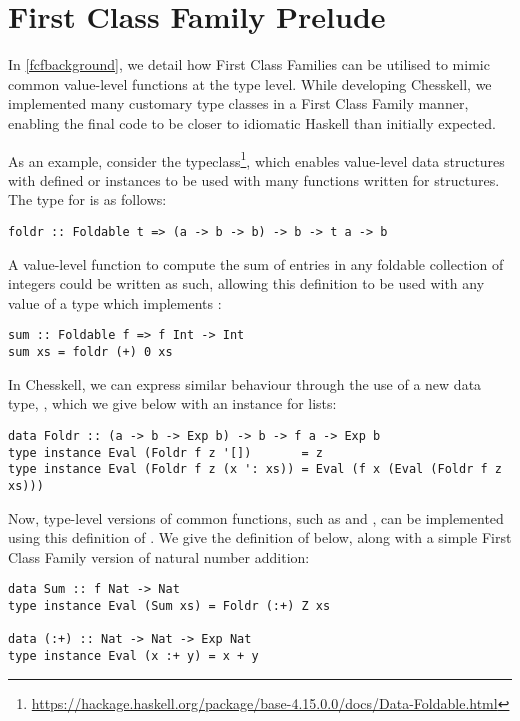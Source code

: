 \section{First Class Family Prelude}

In \cref{fcfbackground}, we detail how First Class Families can be utilised to mimic common value-level functions at the type level. While developing Chesskell, we implemented many customary type classes in a First Class Family manner, enabling the final code to be closer to idiomatic Haskell than initially expected.

As an example, consider the  typeclass\footnote{\url{https://hackage.haskell.org/package/base-4.15.0.0/docs/Data-Foldable.html}}, which enables value-level data structures with defined  or  instances to be used with many functions written for  structures. The type for  is as follows:

\begin{lstlisting}
foldr :: Foldable t => (a -> b -> b) -> b -> t a -> b
\end{lstlisting}

A value-level function to compute the sum of entries in any foldable collection of integers could be written as such, allowing this definition to be used with any value of a type which implements :

\begin{lstlisting}
sum :: Foldable f => f Int -> Int
sum xs = foldr (+) 0 xs
\end{lstlisting}

In Chesskell, we can express similar behaviour through the use of a new data type, , which we give below with an  instance for lists:

\begin{lstlisting}
data Foldr :: (a -> b -> Exp b) -> b -> f a -> Exp b
type instance Eval (Foldr f z '[])       = z
type instance Eval (Foldr f z (x ': xs)) = Eval (f x (Eval (Foldr f z xs)))
\end{lstlisting}

Now, type-level versions of common  functions, such as  and , can be implemented using this definition of . We give the definition of  below, along with a simple First Class Family version of natural number addition:

\begin{lstlisting}
data Sum :: f Nat -> Nat
type instance Eval (Sum xs) = Foldr (:+) Z xs

data (:+) :: Nat -> Nat -> Exp Nat
type instance Eval (x :+ y) = x + y
\end{lstlisting}

